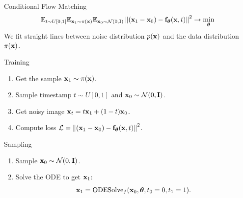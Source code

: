 \begin{frame}{Conditional Flow Matching}
	\vspace{-0.3cm}
	\[
	 \mathbb{E}_{t \sim U[0, 1]} \mathbb{E}_{\mathbf{x}_1 \sim \pi(\mathbf{x})} \mathbb{E}_{\mathbf{x}_0 \sim \mathcal{N}(0, \mathbf{I})}\left\| (\mathbf{x}_1 - \mathbf{x}_0) - \mathbf{f}_{\boldsymbol{\theta}}(\mathbf{x}, t) \right\|^2  \rightarrow \min_{\boldsymbol{\theta}}
	\]
	We fit straight lines between noise distribution $p(\mathbf{x})$ and the data distribution $\pi(\mathbf{x})$.
	\begin{block}{Training}
		\begin{enumerate}
			\item Get the sample $\mathbf{x}_1 \sim \pi(\mathbf{x})$.
			\item Sample timestamp $t \sim U[0, 1]$ and $\mathbf{x}_0 \sim \mathcal{N}(0, \mathbf{I})$.
			\item Get noisy image $\mathbf{x}_t = t \mathbf{x}_1 + (1 - t) \mathbf{x}_0$.
			\item Compute loss $ \mathcal{L} = \left\| (\mathbf{x}_1 - \mathbf{x}_0) - \mathbf{f}_{\boldsymbol{\theta}}(\mathbf{x}, t) \right\|^2 $.
		\end{enumerate}
	\end{block}
	\vspace{-0.3cm}
	\begin{block}{Sampling}
		\begin{enumerate}
			\item Sample $\mathbf{x}_0 \sim \mathcal{N}(0, \mathbf{I})$.
			\item Solve the ODE to get $\mathbf{x}_1$:
			\[
				\mathbf{x}_1 = \text{ODESolve}_f(\mathbf{x}_0, \boldsymbol{\theta}, t_0=0, t_1=1).
			\]
		\end{enumerate}
	\end{block}
\end{frame}
